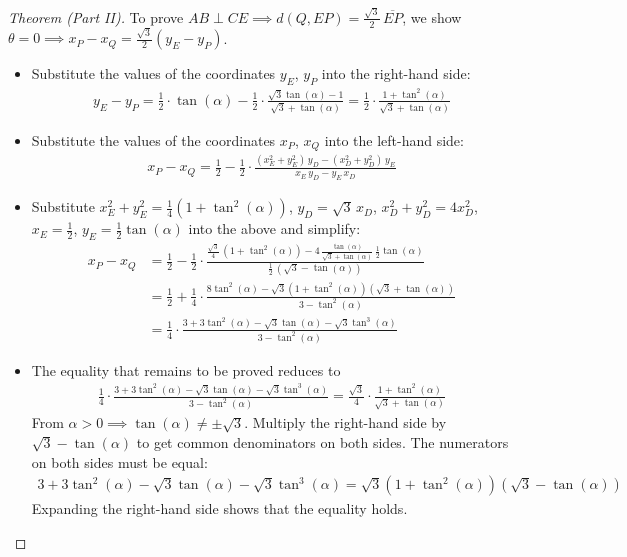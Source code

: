 \begin{proof}[Theorem (Part II)]
To prove $AB \perp CE \implies d(Q,EP)=\frac{\sqrt{3}}{2}\,\overline{EP}$, we show $\theta=0 \implies x_{P}-x_{Q}=\frac{\sqrt{3}}{2} (y_{E}-y_{P})$.
\begin{itemize}
\item Substitute the values of the coordinates $y_{E}$, $y_{P}$ into the right-hand side:
\begin{align*}
y_{E} - y_{P} 
  = \frac{1}{2} \cdot \tan(\alpha) - \frac{1}{2} \cdot \frac{\sqrt{3}\tan(\alpha)-1}{\sqrt{3}+\tan(\alpha)}
  = \frac{1}{2} \cdot \frac{1 + \tan^{2}(\alpha)}{\sqrt{3}+\tan(\alpha)}
\end{align*}
\item Substitute the values of the coordinates $x_{P}$, $x_{Q}$ into the left-hand side:
\begin{align*}
x_{P} - x_{Q} 
  = \frac{1}{2} - \frac{1}{2} \cdot \frac{(x_{E}^{2}+y_{E}^{2}) \, y_{D} - (x_{D}^{2}+y_{D}^{2}) \, y_{E}}{x_{E} \, y_{D} - y_{E} \, x_{D}}
\end{align*}
\item Substitute $x_{E}^{2}+y_{E}^{2}=\frac{1}{4}(1+\tan^{2}(\alpha))$, $y_{D}=\sqrt{3}\,x_{D}$, $x_{D}^{2}+y_{D}^{2}=4x_{D}^{2}$, $x_{E}=\frac{1}{2}$, $y_{E}=\frac{1}{2}\tan(\alpha)$ into the above and simplify:
\begin{align*}
x_{P} - x_{Q} 
& = \frac{1}{2} - \frac{1}{2} \cdot \frac{\frac{\sqrt{3}}{4}\,(1+\tan^{2}(\alpha))-4\,\frac{\tan(\alpha)}{\sqrt{3}+\tan(\alpha)}\,\frac{1}{2}\tan(\alpha)}{\frac{1}{2}\,(\sqrt{3}-\tan(\alpha))}
\\[1ex]
& = \frac{1}{2} + \frac{1}{4} \cdot \frac{8\tan^{2}(\alpha)-\sqrt{3}(1+\tan^{2}(\alpha))(\sqrt{3}+\tan(\alpha))}{3-\tan^{2}(\alpha)}
\\[1ex]
& = \frac{1}{4} \cdot \frac{3+3\tan^{2}(\alpha)-\sqrt{3}\tan(\alpha)-\sqrt{3}\tan^{3}(\alpha)}{3-\tan^{2}(\alpha)}
\end{align*}
\item The equality that remains to be proved reduces to
\begin{align*}
\frac{1}{4} \cdot \frac{3+3\tan^{2}(\alpha)-\sqrt{3}\tan(\alpha)-\sqrt{3}\tan^{3}(\alpha)}{3-\tan^{2}(\alpha)}
= \frac{\sqrt{3}}{4} \cdot \frac{1 + \tan^{2}(\alpha)}{\sqrt{3}+\tan(\alpha)}
\end{align*}
From $\alpha>0 \implies \tan(\alpha)\ne\pm\sqrt{3}$. Multiply the right-hand side by $\sqrt{3}-\tan(\alpha)$ to get common denominators on both sides. The numerators on both sides must be equal:
\begin{align*}
3+3\tan^{2}(\alpha)-\sqrt{3}\tan(\alpha)-\sqrt{3}\tan^{3}(\alpha)
= \sqrt{3} (1+\tan^{2}(\alpha))(\sqrt{3}-\tan(\alpha))
\end{align*}
Expanding the right-hand side shows that the equality holds.
\end{itemize}
\end{proof}

